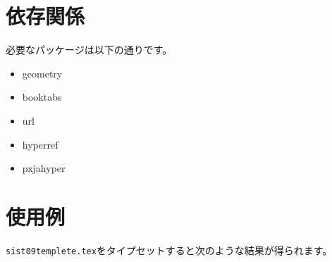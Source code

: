﻿\documentclass[uplatex]{jsarticle}
\renewcommand{\sistTitle}{sist09}%
\renewcommand{\Engtitle}{sist09}%
\renewcommand{\reportnumber}{}%
\renewcommand{\thesis}{パッケージ説明文書}%
\renewcommand{\edition}{(v1.0.0)}%
\renewcommand{\id}{}%
\renewcommand{\sistAuthor}{渡邉　充哉}%
\renewcommand{\Engauthor}{WATANABE Atsuya}%
\renewcommand{\freespace}{}
\renewcommand{\yearr}{2021}%
\renewcommand{\sistDate}{\today}%
\renewcommand{\organization}{~}
\renewcommand{\department}{~}%
\renewcommand{\Engdepartment}{}%
\renewcommand{\address}{}%
\renewcommand{\tel}{}%
\renewcommand{\mail}{}
\renewcommand{\editdata}{\sistDate}%
\begin{document}
\section{依存関係}
必要なパッケージは以下の通りです。
\begin{itemize}
    \item geometry
    \item booktabs
    \item url
    \item hyperref
    \item pxjahyper
\end{itemize}

\section{使用例}
\verb|sist09templete.tex|をタイプセットすると次のような結果が得られます。
\clearpage

\clearpage

\renewcommand{\sistTitle}{\tt\textbackslash sistTitle}%
\renewcommand{\Engtitle}{\tt\textbackslash Engtitle}%
\renewcommand{\reportnumber}{\tt\textbackslash reportnumber}%
\renewcommand{\thesis}{\tt\textbackslash thesis}%
\renewcommand{\edition}{\tt\textbackslash edition}%
\renewcommand{\id}{\tt\textbackslash id}%
\renewcommand{\sistAuthor}{\tt \textbackslash sistAuthor}%
\renewcommand{\Engauthor}{\tt\textbackslash Engauthor}%
\renewcommand{\freespace}{\tt\textbackslash freespace}
\renewcommand{\yearr}{\tt\textbackslash yearr}%
\renewcommand{\sistDate}{\tt\textbackslash sistDate}%
\renewcommand{\organization}{\tt\textbackslash organization}
\renewcommand{\department}{\tt\textbackslash department}%
\renewcommand{\Engdepartment}{\tt\textbackslash Engdepartment}%
\renewcommand{\address}{\tt\textbackslash address}%
\renewcommand{\tel}{\tt\textbackslash tel}%
\renewcommand{\mail}{\tt\textbackslash mail}
\renewcommand{\editdata}{\tt\textbackslash editdata}%
\renewcommand{\syoroku}{\tt\textbackslash syoroku}
\renewcommand{\datee}{\tt\textbackslash datee}
\renewcommand{\Engaddress}{\tt\textbackslash Engaddress}
\renewcommand{\ISBN}{\tt\textbackslash ISBN}
\renewcommand{\ISSN}{\tt\textbackslash ISSN}
\renewcommand{\keyword}{\tt\textbackslash keyword}
\renewcommand{\thesaurus}{\tt\textbackslash thesaurus}
\renewcommand{\category}{\tt\textbackslash category}
\renewcommand{\valuee}{\tt\textbackslash valuee}
\maketitlepage
\makedocumentseet
\end{document}
